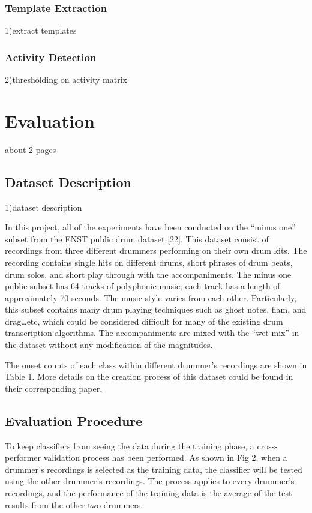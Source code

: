 \documentclass{article}
\begin{document}
\subsubsection{Template Extraction}\label{subsubsec:template extraction}
1)extract templates



\subsubsection{Activity Detection}\label{subsubsec:activity detection}
2)thresholding on activity matrix


\section{Evaluation}\label{sec:Evaluation}

about 2 pages

\subsection{Dataset Description}\label{subsec:dataset description}

1)dataset description

In this project, all of the experiments have been conducted on the “minus one” subset from the ENST public drum dataset [22].  This dataset consist of recordings from three different drummers performing on their own drum kits. The recording contains single hits on different drums, short phrases of drum beats, drum solos, and short play through with the accompaniments. The minus one public subset has 64 tracks of polyphonic music; each track has a length of approximately 70 seconds. The music style varies from each other. Particularly, this subset contains many drum playing techniques such as ghost notes, flam, and drag…etc, which could be considered difficult for many of the existing drum transcription algorithms. The accompaniments are mixed with the “wet mix” in the dataset without any modification of the magnitudes.   

The onset counts of each class within different drummer’s recordings are shown in Table 1. More details on the creation process of this dataset could be found in their corresponding paper. 




\subsection{Evaluation Procedure}\label{subsec:evaluation procedure}
To keep classifiers from seeing the data during the training phase, a cross-performer validation process has been performed. As shown in Fig 2, when a drummer’s recordings is selected as the training data, the classifier will be tested using the other drummer’s recordings. The process applies to every drummer’s recordings, and the performance of the training data is the average of the test results from the other two drummers.
\end{document}

